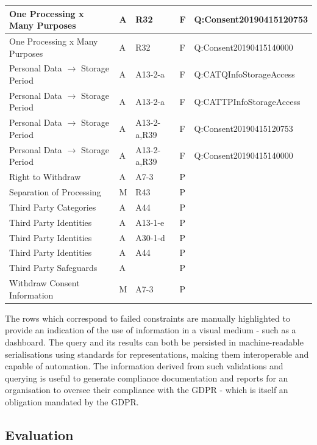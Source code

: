 \begin{center}
\begin{tabularx}{\linewidth}{|l|X|X|X|l|}
\rowcolor{lightred} One Processing x Many Purposes & A & R32 & F & Q:Consent20190415120753 \\ \hline
\rowcolor{lightred} One Processing x Many Purposes & A & R32 & F & Q:Consent20190415140000 \\ \hline
\rowcolor{lightred} Personal Data $\rightarrow$ Storage Period & A & A13-2-a & F & Q:CATQInfoStorageAccess \\ \hline
\rowcolor{lightred} Personal Data $\rightarrow$ Storage Period & A & A13-2-a & F & Q:CATTPInfoStorageAccess \\ \hline
\rowcolor{lightred} Personal Data $\rightarrow$ Storage Period & A & A13-2-a,R39 & F & Q:Consent20190415120753 \\ \hline
\rowcolor{lightred} Personal Data $\rightarrow$ Storage Period & A & A13-2-a,R39 & F & Q:Consent20190415140000 \\ \hline
Right to Withdraw & A & A7-3 & P &  \\ \hline
Separation of Processing & M & R43 & P &  \\ \hline
Third Party Categories & A & A44 & P &  \\ \hline
Third Party Identities & A & A13-1-e & P &  \\ \hline
Third Party Identities & A & A30-1-d & P &  \\ \hline
Third Party Identities & A & A44 & P &  \\ \hline
Third Party Safeguards & A &  & P &  \\ \hline
Withdraw Consent Information & M & A7-3 & P &  \\
\bottomrule
\end{tabularx}
\end{center}

The rows which correspond to failed constraints are manually highlighted to provide an indication of the use of information in a visual medium - such as a dashboard.
The query and its results can both be persisted in machine-readable serialisations using standards for representations, making them interoperable and capable of automation.
The information derived from such validations and querying is useful to generate compliance documentation and reports for an organisation to oversee their compliance with the GDPR - which is itself an obligation mandated by the GDPR.

\subsection{Evaluation}

